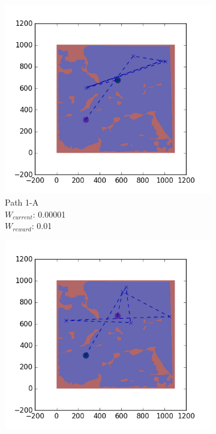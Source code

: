\documentclass{tamuccthesis}
\begin{document}
\begin{figure}
\begin{subfigure}[b]{0.24\textwidth}
        \includegraphics[width=\textwidth,trim={4cm 3cm 2cm 3cm},clip]{EXP3RG_PathAa_-1_-1_-1_0d01.png}
        \caption[]{{\small Path 1-A \\ $W_{current}$: 0.00001 \\ $W_{reward}$: 0.01}}
        \label{fig:Path_1-A_upReward_Work}
    \end{subfigure}
    \begin{subfigure}[b]{0.24\textwidth}
        \centering
        \includegraphics[width=\textwidth,trim={4cm 3cm 2cm 3cm},clip]{EXP3RG_PathAb_-1_-1_0_0d01.png}

\end{subfigure}
\end{figure}
\end{document}
